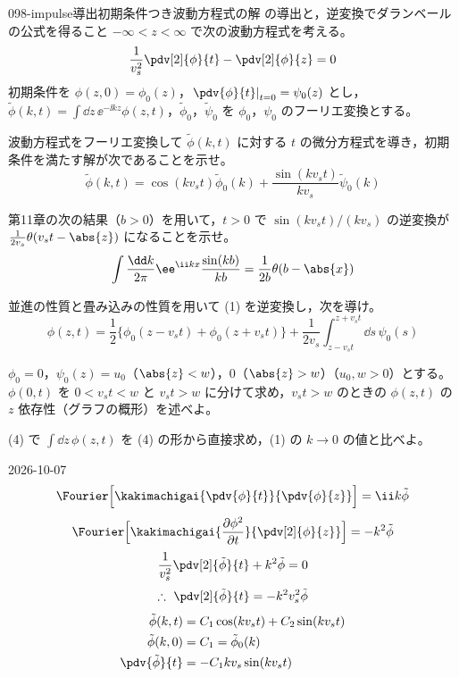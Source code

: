 \documentclass[uplatex,dvipdfmx,a4paper,11pt]{jsarticle}
\begin{document}
\begin{mondai}{098-impulse}{導出}{初期条件つき波動方程式の解  の導出と，逆変換でダランベールの公式を得ること}
$-\infty<z<\infty$ で次の波動方程式を考える。
  \[ \frac{1}{v_s^{2}}\pdv[2]{\phi}{t}-\pdv[2]{\phi}{z}=0 \]
  初期条件を $\phi(z,0)=\phi_0(z)$，$\left.\pdv{\phi}{t}\right|_{t=0}=\psi_0(z)$ とし，$\tilde{\phi}(k,t)=\int\dd z\,\ee^{-\ii kz}\phi(z,t)$，$\tilde{\phi}_0$，$\tilde{\psi}_0$ を $\phi_0$，$\psi_0$ のフーリエ変換とする。
  \begin{shoumon}
    \item 波動方程式をフーリエ変換して $\tilde{\phi}(k,t)$ に対する $t$ の微分方程式を導き，初期条件を満たす解が次であることを示せ。
      \[ \tilde{\phi}(k,t)=\cos(kv_st)\tilde{\phi}_0(k)+\frac{\sin(kv_st)}{kv_s}\tilde{\psi}_0(k) \]
    \item 第11章の次の結果（$b>0$）を用いて，$t>0$ で $\sin(kv_st)/(kv_s)$ の逆変換が $\frac{1}{2v_s}\theta(v_st-\abs{z})$ になることを示せ。
      \[ \int\frac{\dd k}{2\pi}\ee^{\ii kx}\frac{\sin(kb)}{kb}=\frac{1}{2b}\theta(b-\abs{x}) \]
    \item 並進の性質と畳み込みの性質を用いて (1) を逆変換し，次を導け。
      \[ \phi(z,t)=\frac{1}{2}\{\phi_0(z-v_st)+\phi_0(z+v_st)\}+\frac{1}{2v_s}\int_{z-v_st}^{z+v_st}\dd s\,\psi_0(s) \]
    \item $\phi_0=0$，$\psi_0(z)=u_0$（$\abs{z}<w$），$0$（$\abs{z}>w$）（$u_0,w>0$）とする。$\phi(0,t)$ を $0<v_st<w$ と $v_st>w$ に分けて求め，$v_st>w$ のときの $\phi(z,t)$ の $z$ 依存性（グラフの概形）を述べよ。
    \item (4) で $\int\dd z\,\phi(z,t)$ を (4) の形から直接求め，(1) の $k\to0$ の値と比べよ。
  \end{shoumon}
\begin{kotaeutsushi}{2026-10-07}
\[ \Fourier\Bigl[\kakimachigai{\pdv{\phi}{t}}{\pdv{\phi}{z}}\Bigr]=\ii k\tilde{\phi} \]
\[ \Fourier\Bigl[\kakimachigai{\frac{\partial\phi^{2}}{\partial t}}{\pdv[2]{\phi}{z}}\Bigr]=-k^{2}\tilde{\phi} \]
\[ \frac{1}{v_s^{2}}\pdv[2]{\tilde{\phi}}{t}+k^{2}\tilde{\phi}=0 \]
\[ \therefore\ \pdv[2]{\tilde{\phi}}{t}=-k^{2}v_s^{2}\tilde{\phi} \]
\begin{align*}
  \tilde{\phi}(k,t)&=C_1\cos(kv_st)+C_2\sin(kv_st)\\
  \tilde{\phi}(k,0)&=C_1=\tilde{\phi}_0(k)\\
  \pdv{\tilde{\phi}}{t}&=-C_1kv_s\sin(kv_st)\\

\end{align*}
\end{kotaeutsushi}
\end{mondai}
\end{document}
